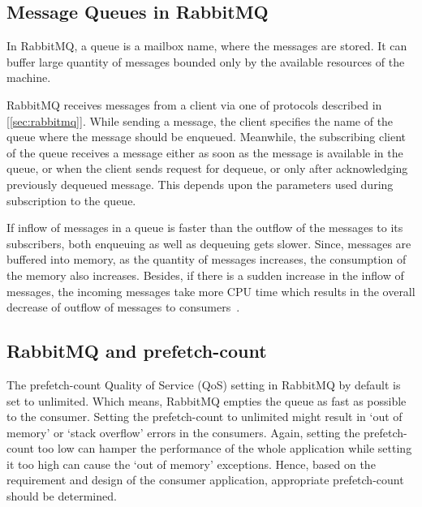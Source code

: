   \subsection{Message Queues in RabbitMQ}
  In RabbitMQ, a queue is a mailbox name, where the messages are stored. It can buffer large quantity of messages bounded only by the available resources of the machine.

  RabbitMQ receives messages from a client via one of protocols described in [\autoref{sec:rabbitmq}]. While sending a message, the client specifies the name of the queue where the message should be enqueued. Meanwhile, the subscribing client of the queue receives a message either as soon as the message is available in the queue, or when the client sends request for dequeue, or only after acknowledging previously dequeued message. This depends upon the parameters used during subscription to the queue.

  If inflow of messages in a queue is faster than the outflow of the messages to its subscribers, both enqueuing as well as dequeuing gets slower. Since, messages are buffered into memory, as the quantity of messages increases, the consumption of the memory also increases. Besides, if there is a sudden increase in the inflow of messages, the incoming messages take more CPU time which results in the overall decrease of outflow of messages to consumers~\cite{sizingYourRabbits}.

  \subsection{RabbitMQ and prefetch-count}
  \label{subsec:rabbitmqPrefetch}
  The prefetch-count Quality of Service (QoS) setting in RabbitMQ by default is set to unlimited. Which means, RabbitMQ empties the queue as fast as possible to the consumer. Setting the prefetch-count to unlimited might result in ‘out of memory’ or ‘stack overflow’ errors in the consumers. Again, setting the prefetch-count too low can hamper the performance of the whole application while setting it too high can cause the ‘out of memory’ exceptions. Hence, based on the requirement and design of the consumer application, appropriate prefetch-count should be determined.


